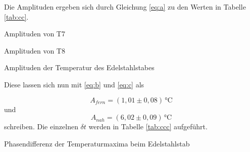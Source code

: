 \noindent Die Amplituden ergeben sich durch Gleichung \ref{eq:a} zu den Werten in Tabelle \ref{tab:cc}.
 
 
 \begin{table}[H]
  \centering
    \begin{subtable}{.42\linewidth}
      \centering
            \caption{Amplituden von T7}

    \end{subtable}
    \begin{subtable}{.42\linewidth}
      \centering
           \caption{Amplituden von T8}

    \end{subtable} 
        \caption{Amplituden der Temperatur des Edelstahlstabes}
    \label{tab:cc}
\end{table}

\noindent Diese lassen sich nun mit \ref{eq:b} und \ref{eq:c} als 

\begin{equation*}
  A_{fern}=(1,01 \pm 0,08)\,\si{\celsius} 
\end{equation*}
\noindent und
\begin{equation*}
  A_{nah}=(6,02 \pm 0,09)\,\si{\celsius} 
\end{equation*}
\noindent schreiben. Die einzelnen $\delta t$ werden in Tabelle \ref{tab:ccc} aufgeführt.


\begin{table}[H]
      \centering

        \caption{Phasendifferenz der Temperaturmaxima beim Edelstahlstab}
    \label{tab:ccc}
\end{table}

